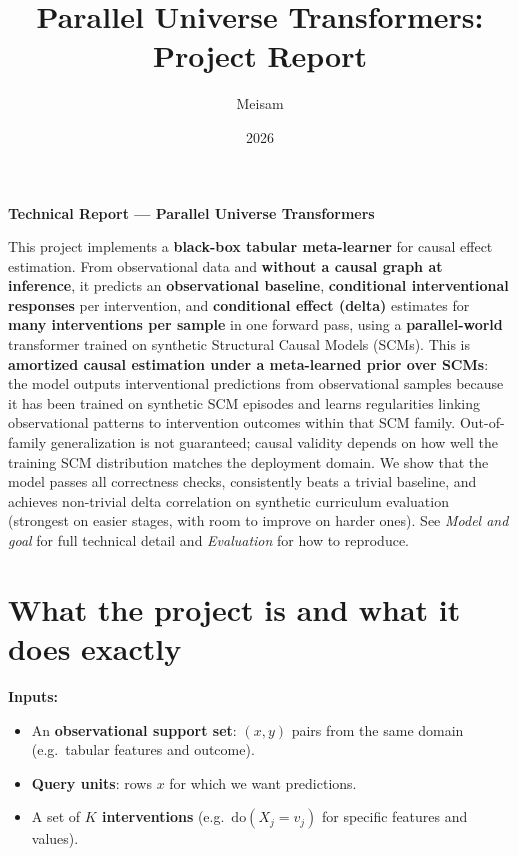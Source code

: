 \documentclass[12pt]{article}
\title{Parallel Universe Transformers: Project Report}
\author{Meisam}
\date{2026}
\begin{document}
\maketitle

\begin{center}
    \textbf{Technical Report --- Parallel Universe Transformers}
\end{center}

This project implements a \textbf{black-box tabular meta-learner} for causal effect estimation. From observational data and \textbf{without a causal graph at inference}, it predicts an \textbf{observational baseline}, \textbf{conditional interventional responses} per intervention, and \textbf{conditional effect (delta)} estimates for \textbf{many interventions per sample} in one forward pass, using a \textbf{parallel-world} transformer trained on synthetic Structural Causal Models (SCMs). This is \textbf{amortized causal estimation under a meta-learned prior over SCMs}: the model outputs interventional predictions from observational samples because it has been trained on synthetic SCM episodes and learns regularities linking observational patterns to intervention outcomes within that SCM family. Out-of-family generalization is not guaranteed; causal validity depends on how well the training SCM distribution matches the deployment domain. We show that the model passes all correctness checks, consistently beats a trivial baseline, and achieves non-trivial delta correlation on synthetic curriculum evaluation (strongest on easier stages, with room to improve on harder ones). See \textit{Model and goal} for full technical detail and \textit{Evaluation} for how to reproduce.

\section{What the project is and what it does exactly}

\textbf{Inputs:}
\begin{itemize}
    \item An \textbf{observational support set}: $(x, y)$ pairs from the same domain (e.g.\ tabular features and outcome).
    \item \textbf{Query units}: rows $x$ for which we want predictions.
    \item A set of \textbf{$K$ interventions} (e.g.\ $\text{do}(X_j = v_j)$ for specific features and values).
\end{itemize}
\end{document}
